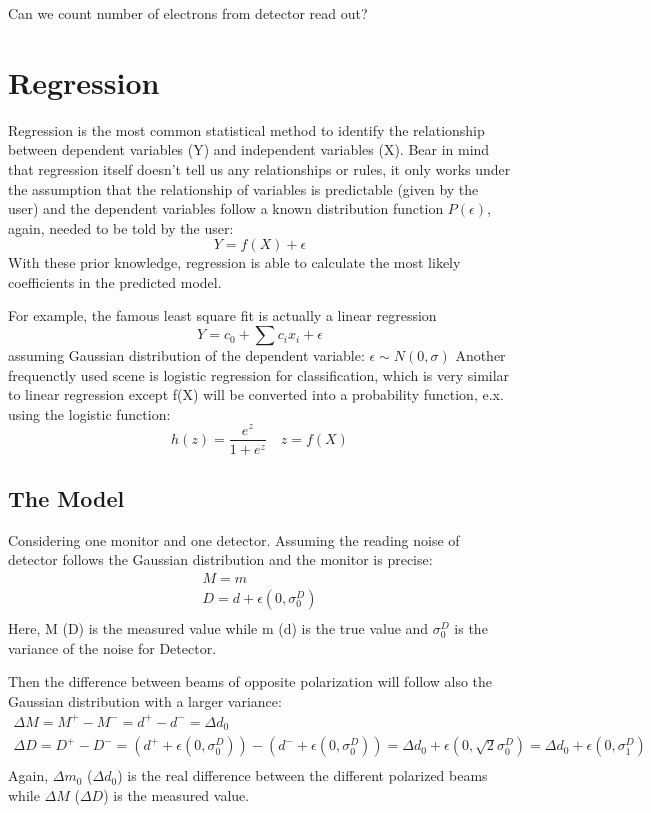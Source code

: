 Can we count number of electrons from detector read out?

\section{Regression}
Regression is the most common statistical method to identify the relationship
between dependent variables (Y) and independent variables (X). Bear in mind that 
regression itself doesn't tell us any relationships or rules, it only works under
the assumption that the relationship of variables is predictable (given by the user) 
and the dependent variables follow a known distribution function $P(\epsilon)$, 
again, needed to be told by the user:
$$ Y = f(X) + \epsilon $$
With these prior knowledge, regression is able to calculate the most likely 
coefficients in the predicted model.

For example, the famous least square fit is actually a linear regression 
$$ Y = c_0 + \sum c_i x_i + \epsilon $$
assuming Gaussian distribution of the dependent variable: $\epsilon \sim N(0, \sigma)$
Another frequenctly used scene is logistic regression for classification, which
is very similar to linear regression except f(X) will be converted into a
probability function, e.x. using the logistic function:
$$ h(z) = \frac{e^z}{1 + e^z} \quad z = f(X) $$

\subsection{The Model}
Considering one monitor and one detector. Assuming the reading noise of detector
follows the Gaussian distribution and the monitor is precise:
\begin{equation*}
    \begin{gathered}
	M = m	\\
	D = d + \epsilon(0, \sigma_0^D)    \\
    \end{gathered}
\end{equation*}
Here, M (D) is the measured value while m (d) is the true value and $\sigma_0^D$ 
is the variance of the noise for Detector.

Then the difference between beams of opposite polarization will follow also
the Gaussian distribution with a larger variance:
\begin{equation*}
    \begin{gathered}
	\Delta M = M^+ - M^- = d^+ - d^-    
	    = \Delta d_0    \\
	\Delta D = D^+ - D^- = (d^+ + \epsilon(0, \sigma_0^D)) - (d^- + \epsilon(0, \sigma_0^D))
	    = \Delta d_0 + \epsilon(0, \sqrt{2}\sigma_0^D)
	    = \Delta d_0 + \epsilon(0, \sigma_1^D) \\
    \end{gathered}
\end{equation*}
Again, $\Delta m_0$ ($\Delta d_0$) is the real difference between the
different polarized beams while $\Delta M$ ($\Delta D$) is the measured value.

